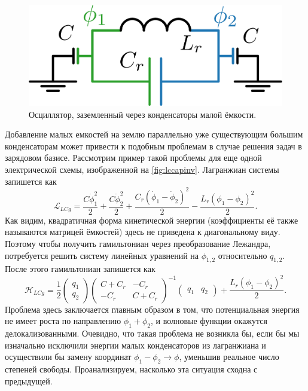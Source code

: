 \documentclass[14pt, a4paper]{extreport}
\numberwithin{equation}{section}
\begin{document}
\begin{figure}
	\centering
	\includegraphics[width=0.7\linewidth]{Pictures/lc_cap_inv}
	\caption{Осциллятор, заземленный через конденсаторы малой ёмкости.}
	\label{fig:lccapinv}
\end{figure}

Добавление малых емкостей на землю параллельно уже существующим большим конденсаторам может привести к подобным проблемам в случае решения задач в зарядовом базисе. Рассмотрим пример такой проблемы для еще одной электрической схемы, изображенной на \autoref{fig:lccapinv}. Лагранжиан системы запишется как
\begin{equation}
	\mathcal{L}_{LCg} = \frac{C \dot \phi_1^2}{2} + \frac{C \dot \phi_2^2}{2} + \frac{C_r\left(\dot\phi_1 - \dot\phi_2\right)^2}{2} - \frac{L_r \left(\phi_1  - \phi_2\right)^2}{2}.\label{eq:l_lcg}
\end{equation}
Как видим, квадратичная форма кинетической энергии (коэффициенты её также называются матрицей ёмкостей) здесь не приведена к диагональному виду. Поэтому чтобы получить гамильтониан через преобразование Лежандра, потребуется решить систему линейных уравнений на $\phi_{1,2}$ относительно $q_{1,2}$. После этого гамильтониан запишется как 
\begin{equation}
	\mathcal{H}_{LCg} = \frac{1}{2} \left(\begin{matrix} q_1\\q_2\end{matrix}\right) \left(\begin{matrix}
	C+C_r & -C_r \\
	-C_r & C+C_r
	\end{matrix}\right)^{-1}\left(\begin{matrix} q_1&q_2\end{matrix}\right)+\frac{L_r \left(\phi_1  - \phi_2\right)^2}{2}.
\end{equation}
Проблема здесь заключается главным образом в том, что потенциальная энергия не имеет роста по направлению $\phi_1 + \phi_2$, и волновые функции окажутся делокализованными. Очевидно, что такая проблема не возникла бы, если бы мы изначально исключили энергии малых конденсаторов из лагранжиана и осуществили бы замену координат $\phi_1 - \phi_2 \rightarrow \phi$, уменьшив реальное число степеней свободы. Проанализируем, насколько эта ситуация сходна с предыдущей.
\end{document}

